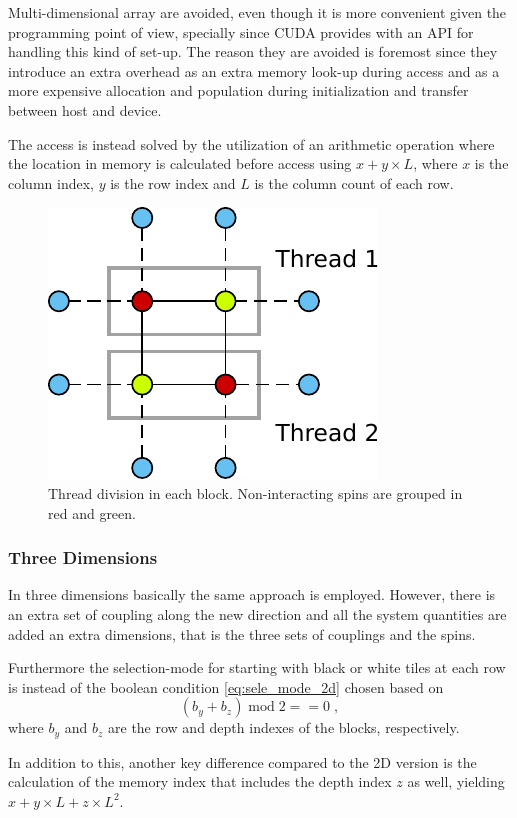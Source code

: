 \documentclass[paper=a4, fontsize=11pt]{scrartcl} %
\numberwithin{equation}{section} %
\numberwithin{figure}{section} %
\numberwithin{table}{section} %
\begin{document}
Multi-dimensional array are avoided, even though it is more convenient given the programming point of view, specially since CUDA provides with an API for handling this kind of set-up. The reason they are avoided is foremost since they introduce an extra overhead as an extra memory look-up during access and as a more expensive allocation and population during initialization and transfer between host and device.

The access is instead solved by the utilization of an arithmetic operation where the location in memory is calculated before access using $x + y \times L$, where $x$ is the column index, $y$ is the row index and $L$ is the column count of each row.

\begin{figure}
\centering
\includegraphics[width=.4\linewidth]{images/2D_threads.pdf}
\caption{Thread division in each block. Non-interacting spins are grouped in red and green.}
\label{fig:2D_threads}
\end{figure}


\subsubsection{Three Dimensions}
In three dimensions basically the same approach is employed. However, there is an extra set of coupling along the new direction and all the system quantities are added an extra dimensions, that is the three sets of couplings and the spins. 

Furthermore the selection-mode for starting with black or white tiles at each row is instead of the boolean condition \ref{eq:sele_mode_2d} chosen based on
\begin{equation}
(b_y + b_z)\; \text{mod} \; 2 == 0 \;,
\end{equation}
where $b_y$ and $b_z$ are the row and depth indexes of the blocks, respectively. 

In addition to this, another key difference compared to the 2D version is the calculation of the memory index that includes the depth index $z$ as well, yielding $x + y \times L + z \times L^2$.
\end{document}
